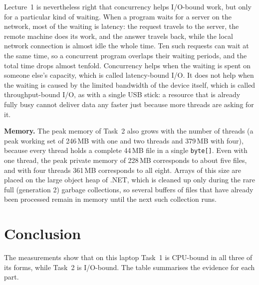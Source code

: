 \documentclass[11pt,a4paper]{article}
\begin{document}
Lecture~1 is nevertheless right that concurrency helps I/O-bound work, but only for a particular kind
of waiting. When a program waits for a server on the network, most of the waiting is latency: the
request travels to the server, the remote machine does its work, and the answer travels back, while
the local network connection is almost idle the whole time. Ten such requests can wait at the same
time, so a concurrent program overlaps their waiting periods, and the total time drops almost
tenfold. Concurrency helps when the waiting is spent on someone else's capacity, which is called
latency-bound I/O. It does not help when the waiting is caused by the limited bandwidth of the device
itself, which is called throughput-bound I/O, as with a single USB stick: a resource that is already
fully busy cannot deliver data any faster just because more threads are asking for it.

\textbf{Memory.} The peak memory of Task~2 also grows with the number of threads (a peak working set
of 246\,MB with one and two threads and 379\,MB with four), because every thread holds a complete
44\,MB file in a single \texttt{byte[]}. Even with one thread, the peak private memory of 228\,MB
corresponds to about five files, and with four threads 361\,MB corresponds to all eight. Arrays of this size are placed on the large object heap of
.NET, which is cleaned up only during the rare full (generation 2) garbage collections, so several
buffers of files that have already been processed remain in memory until the next such collection
runs.

\section{Conclusion}

The measurements show that on this laptop Task~1 is CPU-bound in all three of its forms, while Task~2
is I/O-bound. The table summarises the evidence for each part.
\end{document}
